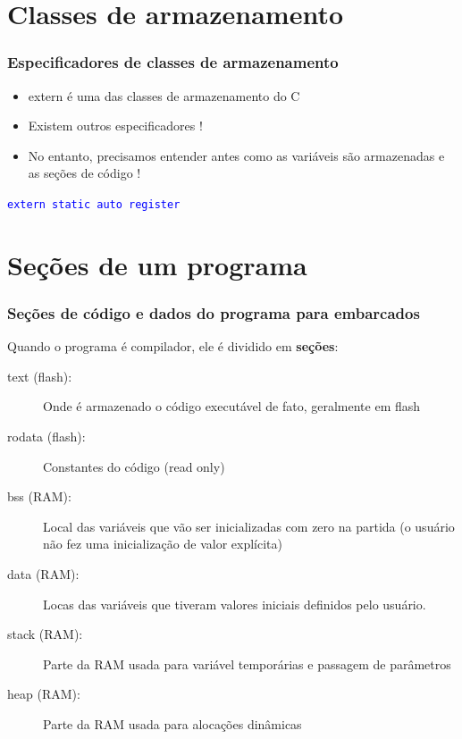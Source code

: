 \documentclass{beamer}
\begin{document}
\section{Classes de armazenamento}

\begin{frame}
	\frametitle{Especificadores de classes de armazenamento}
	\begin{itemize}
	\item extern é uma das classes de armazenamento do C
	\item Existem outros especificadores !
	\item No entanto, precisamos entender antes como as variáveis são armazenadas e as seções de código !
	\end{itemize}
	\vspace*{0.5cm}
	\begin{center}
		\texttt{\textcolor{blue}{extern static auto register}}
	\end{center}
	
\end{frame}

\section{Seções de um programa}

\begin{frame}
	\frametitle{Seções de código e dados do programa para embarcados}
    Quando o programa é compilador, ele é dividido em \textbf{seções}:
    \vspace*{0.5cm}
    \begin{description}
    \item[text (flash):] Onde é armazenado o código executável de fato, geralmente em flash
    \item[rodata (flash):] Constantes do código (read only)
    \item[bss (RAM):] Local das variáveis que vão ser inicializadas com zero na partida (o usuário não fez uma inicialização de valor explícita)
    \item[data (RAM):] Locas das variáveis que tiveram valores iniciais definidos pelo usuário.
    \item[stack (RAM):] Parte da RAM usada para variável temporárias e passagem de parâmetros
    \item[heap (RAM):] Parte da RAM usada para alocações dinâmicas
    \end{description}
\end{frame}
\end{document}
